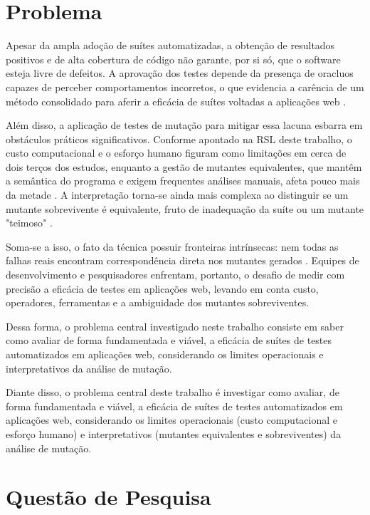 \section{Problema}

Apesar da ampla adoção de suítes automatizadas, a obtenção de resultados positivos e de alta cobertura de código não garante, por si só, que o software esteja livre de defeitos. A aprovação dos testes depende da presença de oracluos capazes de perceber comportamentos incorretos, o que evidencia a carência de um método consolidado para aferir a eficácia de suítes voltadas a aplicações web \cite{yandrapally2021}. 

Além disso, a aplicação de testes de mutação para mitigar essa lacuna esbarra em obstáculos práticos significativos. Conforme apontado na RSL deste trabalho, o custo computacional e o esforço humano figuram como limitações em cerca de dois terços dos estudos, enquanto a gestão de mutantes equivalentes, que mantêm a semântica do programa e exigem frequentes análises manuais, afeta pouco mais da metade \cite{yao2014}. A interpretação torna-se ainda mais complexa ao distinguir se um mutante sobrevivente é equivalente, fruto de inadequação da suíte ou um mutante "teimoso" \cite{yao2014}.

Soma-se a isso, o fato da técnica possuir fronteiras intrínsecas: nem todas as falhas reais encontram correspondência direta nos mutantes gerados \cite{just2014}. Equipes de desenvolvimento e pesquisadores enfrentam, portanto, o desafio de medir com precisão a eficácia de testes em aplicações web, levando em conta custo, operadores, ferramentas e a ambiguidade dos mutantes sobreviventes.

Dessa forma, o problema central investigado neste trabalho consiste em saber como avaliar de forma fundamentada e viável, a eficácia de suítes de testes automatizados em aplicações web, considerando os limites operacionais e interpretativos da análise de mutação.

Diante disso, o problema central deste trabalho é investigar como avaliar, de forma fundamentada e viável, a eficácia de suítes de testes automatizados em aplicações web, considerando os limites operacionais (custo computacional e esforço humano) e interpretativos (mutantes equivalentes e sobreviventes) da análise de mutação.



\section{Questão de Pesquisa}

